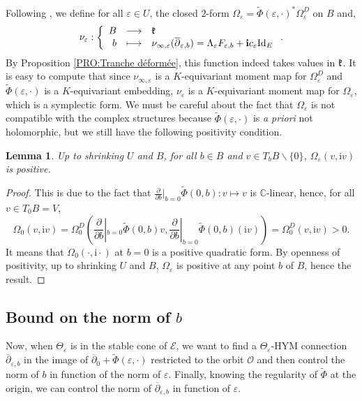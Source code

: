 \documentclass{article}
\newtheorem{lemma}[theorem]{Lemma}
\theoremstyle{remark}
\theoremstyle{definition}
\newcommand{\C}{\mathbb{C}}
\newcommand{\Id}{\mathrm{Id}}
\renewcommand{\i}{\boldsymbol{\mathrm{i}}}
\newcommand{\E}{\mathcal{E}}
\newcommand{\dbar}{\overline{\partial}}
\newcommand{\fonction}[4]{\left\{ \begin{array}{rcl}
		\displaystyle #1 & \longrightarrow & \displaystyle #2\\
		\displaystyle #3 & \longmapsto & \displaystyle #4
	\end{array} \right.}
\begin{document}
Following \cite[Section 3.2]{Clarke_Tipler}, we define for all $\varepsilon \in U$, the closed $2$-form $\Omega_\varepsilon = \tilde{\Phi}(\varepsilon,\cdot)^*\Omega_\varepsilon^D$ on $B$ and,
$$
\nu_\varepsilon : \fonction{B}{\frak{k}}{b}{\nu_{\infty,\varepsilon}(\dbar_{\varepsilon,b}) = \Lambda_\varepsilon F_{\varepsilon,b} + \i c_\varepsilon\Id_E}.
$$
By Proposition \ref{PRO:Tranche déformée}, this function indeed takes values in $\frak{k}$. It is easy to compute that since $\nu_{\infty,\varepsilon}$ is a $K$-equivariant moment map for $\Omega_\varepsilon^D$ and $\tilde{\Phi}(\varepsilon,\cdot)$ is a $K$-equivariant embedding, $\nu_\varepsilon$ is a $K$-equivariant moment map for $\Omega_\varepsilon$, which is a symplectic form. We must be careful about the fact that $\Omega_\varepsilon$ is not compatible with the complex structures because $\tilde{\Phi}(\varepsilon,\cdot)$ is \textit{a priori} not holomorphic, but we still have the following positivity condition.
\begin{lemma}\label{LEM:Omega positive}
    Up to shrinking $U$ and $B$, for all $b \in B$ and $v \in T_bB\backslash\{0\}$, $\Omega_\varepsilon(v,\i v)$ is positive.
\end{lemma}
\begin{proof}
This is due to the fact that $\frac{\partial}{\partial b}|_{b = 0}\tilde{\Phi}(0,b) : v \mapsto v$ is $\C$-linear, hence, for all $v \in T_0B = V$,
$$
\Omega_0(v,\i v) = \Omega_0^D\left(\frac{\partial}{\partial b}|_{b = 0}\tilde{\Phi}(0,b)v,\frac{\partial}{\partial b}|_{b = 0}\tilde{\Phi}(0,b)(\i v)\right) = \Omega_0^D(v,\i v) > 0.
$$
It means that $\Omega_0(\cdot,\i \cdot)$ at $b = 0$ is a positive quadratic form. By openness of positivity, up to shrinking $U$ and $B$, $\Omega_\varepsilon$ is positive at any point $b$ of $B$, hence the result.
\end{proof}

\subsection{Bound on the norm of $b$}

Now, when $\Theta_\varepsilon$ is in the stable cone of $\E$, we want to find a $\Theta_\varepsilon$-HYM connection $\dbar_{\varepsilon,b}$ in the image of $\dbar_0 + \tilde{\Phi}(\varepsilon,\cdot)$ restricted to the orbit $\mathcal{O}$ and then control the norm of $b$ in function of the norm of $\varepsilon$. Finally, knowing the regularity of $\tilde{\Phi}$ at the origin, we can control the norm of $\dbar_{\varepsilon,b}$ in function of $\varepsilon$.
\end{document}
